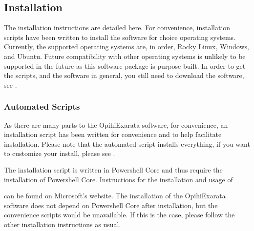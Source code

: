 \documentclass[letterpaper,11pt,english]{sphinxmanual}
\begin{document}
\subsection{Installation}
\label{\detokenize{technical/installation/index:installation}}\label{\detokenize{technical/installation/index:technical-installation}}\label{\detokenize{technical/installation/index::doc}}
\sphinxAtStartPar
The installation instructions are detailed here. For convenience, installation
scripts have been written to install the software for choice operating systems.
Currently, the supported operating systems are, in order, Rocky Linux, Windows,
and Ubuntu. Future compatibility with other operating systems is unlikely to
be supported in the future as this software package is purpose built. In order
to get the scripts, and the software in general, you still need to download the
software, see {\hyperref[\detokenize{technical/installation/download:technical-installation-download}]{}}.


\subsubsection{Automated Scripts}
\label{\detokenize{technical/installation/index:automated-scripts}}\label{\detokenize{technical/installation/index:technical-installation-automated-scripts}}
\sphinxAtStartPar
As there are many parts to the OpihiExarata software, for convenience, an
installation script has been written for convenience and to help facilitate
installation. Please note that the automated script installs everything, if
you want to customize your install, please see
{\hyperref[\detokenize{technical/installation/index:technical-installation-manual-installation}]{}}.

\sphinxAtStartPar
The installation script is written in Powershell Core and thus require the
installation of Powershell Core. Instructions for the installation and usage
of %
\begin{footnote}[26]\sphinxAtStartFootnote
{}
%
\end{footnote} can be
found on Microsoft’s website. The installation of the OpihiExarata software
does not depend on Powershell Core after installation, but the convenience
scripts would be unavailable. If this is the case, please follow the other
installation instructions as usual.
\end{document}
